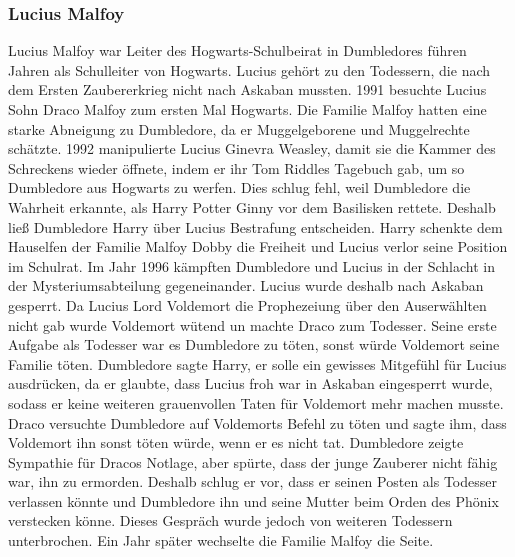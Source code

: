 \documentclass[a4paper, 10pt]{article}
\begin{document}
\subsubsection*{Lucius Malfoy}
Lucius Malfoy war Leiter des Hogwarts-Schulbeirat in Dumbledores führen Jahren als Schulleiter von Hogwarts. Lucius gehört zu den Todessern, die nach dem Ersten Zaubererkrieg nicht nach Askaban mussten. 1991 besuchte Lucius Sohn Draco Malfoy zum ersten Mal Hogwarts. Die Familie Malfoy hatten eine starke Abneigung zu Dumbledore, da er Muggelgeborene und Muggelrechte schätzte. 1992 manipulierte Lucius Ginevra Weasley, damit sie die Kammer des Schreckens wieder öffnete, indem er ihr Tom Riddles Tagebuch gab, um so Dumbledore aus Hogwarts zu werfen. Dies schlug fehl, weil Dumbledore die Wahrheit erkannte, als Harry Potter Ginny vor dem Basilisken rettete. Deshalb ließ Dumbledore Harry über Lucius Bestrafung entscheiden. Harry schenkte dem Hauselfen der Familie Malfoy Dobby die Freiheit und Lucius verlor seine Position im Schulrat. Im Jahr 1996 kämpften Dumbledore und Lucius in der Schlacht in der Mysteriumsabteilung gegeneinander. Lucius wurde deshalb nach Askaban gesperrt. Da Lucius Lord Voldemort die Prophezeiung über den Auserwählten nicht gab wurde Voldemort wütend un machte Draco zum Todesser. Seine erste Aufgabe als Todesser war es Dumbledore zu töten, sonst würde Voldemort seine Familie töten. Dumbledore sagte Harry, er solle ein gewisses Mitgefühl für Lucius ausdrücken, da er glaubte, dass Lucius froh war in Askaban eingesperrt wurde, sodass er keine weiteren grauenvollen Taten für Voldemort mehr machen musste. Draco versuchte Dumbledore auf Voldemorts Befehl zu töten und sagte ihm, dass Voldemort ihn sonst töten würde, wenn er es nicht tat. Dumbledore zeigte Sympathie für Dracos Notlage, aber spürte, dass der junge Zauberer nicht fähig war, ihn zu ermorden. Deshalb schlug er vor, dass er seinen Posten als Todesser verlassen könnte und Dumbledore ihn und seine Mutter beim Orden des Phönix verstecken könne. Dieses Gespräch wurde jedoch von weiteren Todessern unterbrochen. Ein Jahr später wechselte die Familie Malfoy die Seite.
\end{document}
